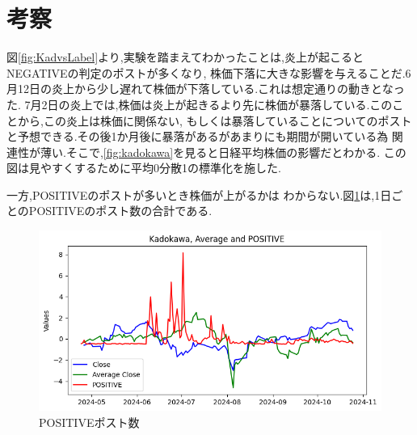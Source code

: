 \documentclass[11pt]{jarticle}
\begin{document}
\section{考察}
図\ref{fig:KadvsLabel}より,実験を踏まえてわかったことは,炎上が起こるとNEGATIVEの判定のポストが多くなり,
株価下落に大きな影響を与えることだ.6月12日の炎上から少し遅れて株価が下落している.これは想定通りの動きとなった.
7月2日の炎上では,株価は炎上が起きるより先に株価が暴落している.このことから,この炎上は株価に関係ない,
もしくは暴落していることについてのポストと予想できる.その後1か月後に暴落があるがあまりにも期間が開いている為
関連性が薄い.そこで,\ref{fig:kadokawa}を見ると日経平均株価の影響だとわかる.
この図は見やすくするために平均0分散1の標準化を施した.


一方,POSITIVEのポストが多いとき株価が上がるかは
わからない.図\ref{fig:kpositive}は,1日ごとのPOSITIVEのポスト数の合計である.
\begin{figure}[htbp]
	\centering
	\includegraphics[scale=0.35]{image/k_positive.png}
	
	\caption{POSITIVEポスト数}
	\label{fig:kpositive}
\end{figure}
\end{document}
